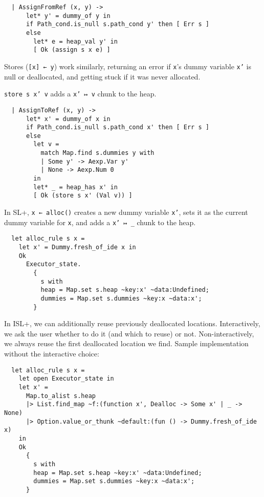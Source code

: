 \documentclass[parskip=half]{scrartcl}
\begin{document}
\begin{verbatim}
  | AssignFromRef (x, y) ->
      let* y' = dummy_of y in
      if Path_cond.is_null s.path_cond y' then [ Err s ]
      else
        let* e = heap_val y' in
        [ Ok (assign s x e) ]
\end{verbatim}


Stores (\texttt{[x] ← y}) work similarly, returning an error if \texttt{x}'s dummy variable \texttt{x'} is null or deallocated, and getting stuck if it was never allocated.

\texttt{store s x' v} adds a \texttt{x' ↦ v} chunk to the heap.

\begin{verbatim}
  | AssignToRef (x, y) ->
      let* x' = dummy_of x in
      if Path_cond.is_null s.path_cond x' then [ Err s ]
      else
        let v =
          match Map.find s.dummies y with
          | Some y' -> Aexp.Var y'
          | None -> Aexp.Num 0
        in
        let* _ = heap_has x' in
        [ Ok (store s x' (Val v)) ]
\end{verbatim}


In SL+, \texttt{x ← alloc()} creates a new dummy variable \texttt{x'}, sets it as the current dummy variable for \texttt{x}, and adds a \texttt{x' ↦ \_} chunk to the heap.

\begin{verbatim}
  let alloc_rule s x =
    let x' = Dummy.fresh_of_ide x in
    Ok
      Executor_state.
        {
          s with
          heap = Map.set s.heap ~key:x' ~data:Undefined;
          dummies = Map.set s.dummies ~key:x ~data:x';
        }
\end{verbatim}

In ISL+, we can additionally reuse previously deallocated locations. Interactively, we ask the user whether to do it (and which to reuse) or not. Non-interactively, we always reuse the first deallocated location we find. Sample implementation without the interactive choice:

\begin{verbatim}
  let alloc_rule s x =
    let open Executor_state in
    let x' =
      Map.to_alist s.heap
      |> List.find_map ~f:(function x', Dealloc -> Some x' | _ -> None)
      |> Option.value_or_thunk ~default:(fun () -> Dummy.fresh_of_ide x)
    in
    Ok
      {
        s with
        heap = Map.set s.heap ~key:x' ~data:Undefined;
        dummies = Map.set s.dummies ~key:x ~data:x';
      }
\end{verbatim}
\end{document}
